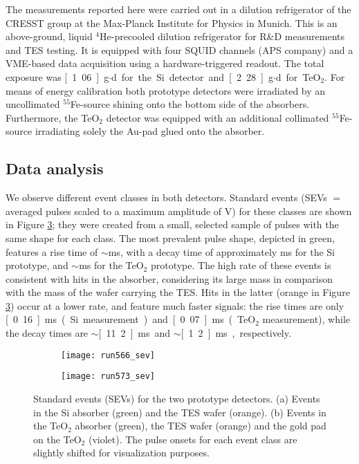 \documentclass[superscriptaddress,nofootinbib ]{revtex4-2}
\begin{document}
The measurements reported here were carried out in a dilution refrigerator of the CRESST group at the Max-Planck Institute for Physics in Munich. This is an above-ground, liquid $^4$He-precooled dilution refrigerator for R\&D measurements and TES testing. It is equipped with four SQUID channels (APS company) and a VME-based data acquisition using a hardware-triggered readout. The total exposure was \unit[1.06]{g$\cdot$d} for the Si detector and~\unit[2.28]{g$\cdot$d} for TeO$_2$. For means of energy calibration both prototype detectors were irradiated by an uncollimated $^{55}$Fe-source shining onto the bottom side of the absorbers. Furthermore, the TeO$_{2}$ detector was equipped with an additional collimated $^{55}$Fe-source irradiating solely the Au-pad glued onto the absorber. 

\subsection{Data analysis}
\label{subsec:dataanalysis}

We observe different event classes in both detectors. Standard events (SEVs $=$ averaged pulses scaled to a maximum amplitude of \unit[1]{V}) for these classes are shown in Figure \ref{fig:sev}; they were created from a small, selected sample of pulses with the same shape for each class. The most prevalent pulse shape, depicted in green, features a rise time of $\sim$\unit[1]{ms}, with a decay time of approximately \unit[44]{ms} for the Si prototype, and $\sim$\unit[122]{ms} for the TeO$_2$ prototype. The high rate of these events is consistent with hits in the absorber, considering its large mass in comparison with the mass of the wafer carrying the TES. Hits in the latter (orange in Figure \ref{fig:sev}) occur at a lower rate, and feature much faster signals: the rise times are only \unit[0.16]{ms} (Si measurement) and \unit[0.07]{ms} (TeO$_2$ measurement), while the decay times are $\sim$\unit[11.2]{ms} and $\sim$\unit[1.2]{ms}, respectively.

\begin{figure}[!htb]
\centering
\begin{subfigure}[b]{0.49\textwidth}
   \texttt{[image: run566\_sev]}
   \caption{}
   \label{fig:sev566}
\end{subfigure}
\hfill
\begin{subfigure}[b]{0.49\textwidth}
   \texttt{[image: run573\_sev]}
   \caption{}
   \label{fig:sev573}
\end{subfigure}
  \caption{Standard events (SEVs) for the two prototype detectors. (a) Events in the Si absorber (green) and the TES wafer (orange). (b) Events in the TeO$_2$ absorber (green), the TES wafer (orange) and the gold pad on the TeO$_2$ (violet). The pulse onsets for each event class are slightly shifted for visualization purposes.}
  \label{fig:sev}
\end{figure}
\end{document}
